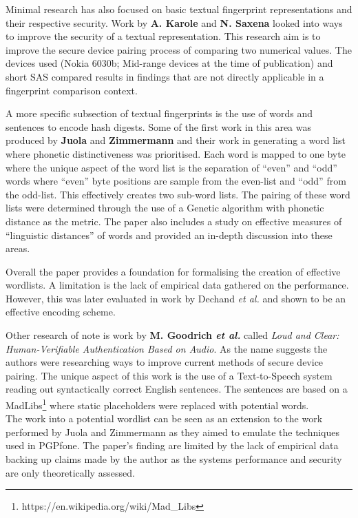 Minimal research has also focused on basic textual fingerprint representations and their respective security. Work by \textbf{A. Karole} and \textbf{N. Saxena}\cite{karole2009improving} looked into ways to improve the security of a textual representation. This research aim is to improve the secure device pairing process of comparing two numerical values. The devices used (Nokia 6030b; Mid-range devices at the time of publication) and short SAS compared results in findings that are not directly applicable in a fingerprint comparison context. 

A more specific subsection of textual fingerprints is the use of words and sentences to encode hash digests. Some of the first work in this area was produced by \textbf{Juola} and \textbf{Zimmermann}
\cite{juola1996whole} and their work in generating a word list where phonetic distinctiveness was prioritised. Each word is mapped to one byte where the unique aspect of the word list is the separation of ``even'' and ``odd'' words where ``even'' byte positions are sample from the even-list and ``odd'' from the odd-list. This effectively creates two sub-word lists. The pairing of these word lists were determined through the use of a Genetic algorithm with phonetic distance as the metric. The paper also includes a study on effective measures of ``linguistic distances'' of words and provided an in-depth discussion into these areas.

Overall the paper provides a foundation for formalising the creation of effective wordlists. A limitation is the lack of empirical data gathered on the performance. However, this was later evaluated in work by Dechand \textit{et al.} \cite{dechand2016empirical} and shown to be an effective encoding scheme.

Other research of note is work by \textbf{M. Goodrich \textit{et al.}}\cite{goodrich2006loud} called \textit{Loud and Clear: Human-Verifiable Authentication Based on Audio}. As the name suggests the authors were researching ways to improve current methods of secure device pairing. The unique aspect of this work is the use of a Text-to-Speech system reading out syntactically correct English sentences. The sentences are based on a MadLibs\footnote{https://en.wikipedia.org/wiki/Mad\_Libs} where static placeholders were replaced with potential words.\\
The work into a potential wordlist can be seen as an extension to the work performed by Juola and Zimmermann\cite{juola1996whole} as they aimed to emulate the techniques used in PGPfone. The paper's finding are limited by the lack of empirical data backing up claims made by the author as the systems performance and security are only theoretically assessed.

